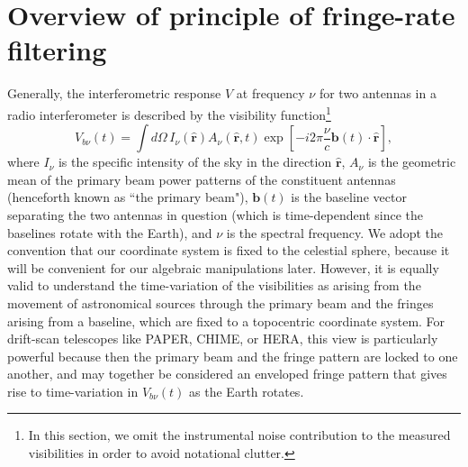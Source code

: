 \documentclass[twocolumn,apj,numberedappendix]{emulateapj}
\newcommand{\rhat}{\hat{\mathbf{r}}}
\begin{document}
\section{Overview of principle of fringe-rate filtering}
\label{sec:overview}
Generally, the interferometric response $V$ at frequency $\nu$ for two antennas in a radio interferometer is described
by the visibility function\footnote{In this section, we omit the instrumental noise contribution to the measured visibilities in order to avoid notational clutter.}
\begin{equation}
\label{eq:originalVis}
V_{b\nu}(t)=\int d\Omega \, {I_\nu(\rhat) A_\nu(\rhat,t) \exp \left[-i2\pi \frac{\nu}{c}  \mathbf{b}(t) \cdot \rhat\right]},
\end{equation}
where $I_\nu$ is the specific intensity of the sky in the direction $\rhat$,
$A_\nu$ is the geometric mean of the primary beam power patterns of the constituent antennas (henceforth known as ``the primary beam"), $\mathbf{ b}(t)$ is the baseline vector separating the two antennas in question (which is time-dependent since the baselines rotate with the Earth), and $\nu$ is the spectral
frequency.
We adopt the convention that our coordinate system is fixed to the celestial sphere, because it will be convenient for our algebraic manipulations later. However, it is equally valid to understand the time-variation of the visibilities as arising from the movement of astronomical sources through the primary beam and the fringes arising from a baseline, which are fixed to a topocentric coordinate system. For drift-scan telescopes like PAPER, CHIME, or HERA, this view is particularly powerful because then the primary beam and the fringe pattern are locked to one another, and may together be considered an enveloped fringe pattern that gives rise
to time-variation in $V_{b\nu}(t)$ as the Earth rotates.
\end{document}
